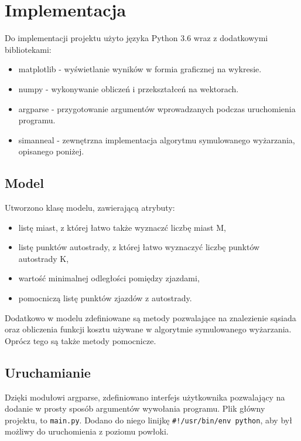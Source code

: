 \documentclass[a4paper]{article}
\begin{document}
\section{Implementacja}

Do implementacji projektu użyto języka Python 3.6 wraz z dodatkowymi bibliotekami:
\begin{itemize}
\item matplotlib - wyświetlanie wyników w formia graficznej na wykresie.
\item numpy - wykonywanie obliczeń i przekształceń na wektorach.
\item argparse - przygotowanie argumentów wprowadzanych podczas uruchomienia programu.
\item simanneal - zewnętrzna implementacja algorytmu symulowanego wyżarzania, opisanego poniżej.
\end{itemize}

\subsection{Model}

Utworzono klasę modelu, zawierającą atrybuty:
\begin{itemize}
\item listę miast, z której łatwo także wyznaczć liczbę miast M,
\item listę punktów autostrady, z której łatwo wyznaczyć liczbę punktów autostrady K,
\item wartość minimalnej odległości pomiędzy zjazdami,
\item pomocniczą listę punktów zjazdów z autostrady.
\end{itemize}

Dodatkowo w modelu zdefiniowane są metody pozwalające na znalezienie sąsiada oraz obliczenia funkcji kosztu używane w algorytmie symulowanego wyżarzania. Oprócz tego są także metody pomocnicze.

\subsection{Uruchamianie}

Dzięki modułowi argparse, zdefiniowano interfejs użytkownika pozwalający na dodanie w prosty sposób argumentów wywołania programu. Plik główny projektu, to \texttt{main.py}. Dodano do niego linijkę \texttt{\#!/usr/bin/env python}, aby był możliwy do uruchomienia z poziomu powłoki.
\end{document}
